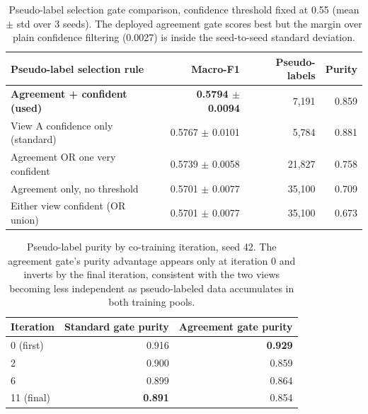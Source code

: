 \begin{table}[H]
\centering
\begin{tabular}{lrrr}
\toprule
\textbf{Pseudo-label selection rule} & \textbf{Macro-F1} & \textbf{Pseudo-labels} & \textbf{Purity} \\
\midrule
\textbf{Agreement + confident (used)} & \textbf{0.5794 $\pm$ 0.0094} & 7{,}191 & 0.859 \\
View A confidence only (standard)     & 0.5767 $\pm$ 0.0101 & 5{,}784 & 0.881 \\
Agreement OR one very confident       & 0.5739 $\pm$ 0.0058 & 21{,}827 & 0.758 \\
Agreement only, no threshold          & 0.5701 $\pm$ 0.0077 & 35{,}100 & 0.709 \\
Either view confident (OR union)      & 0.5701 $\pm$ 0.0077 & 35{,}100 & 0.673 \\
\bottomrule
\end{tabular}
\caption{Pseudo-label selection gate comparison, confidence threshold fixed
at 0.55 (mean $\pm$ std over 3 seeds). The deployed agreement gate scores
best but the margin over plain confidence filtering (0.0027) is inside the
seed-to-seed standard deviation.}
\label{tab:gate-comparison}
\end{table}

\begin{table}[H]
\centering
\begin{tabular}{lrr}
\toprule
\textbf{Iteration} & \textbf{Standard gate purity} & \textbf{Agreement gate purity} \\
\midrule
0 (first)     & 0.916 & \textbf{0.929} \\
2             & 0.900 & 0.859 \\
6             & 0.899 & 0.864 \\
11 (final)    & \textbf{0.891} & 0.854 \\
\bottomrule
\end{tabular}
\caption{Pseudo-label purity by co-training iteration, seed 42. The
agreement gate's purity advantage appears only at iteration 0 and inverts by
the final iteration, consistent with the two views becoming less independent
as pseudo-labeled data accumulates in both training pools.}
\label{tab:purity-trajectory}
\end{table}

